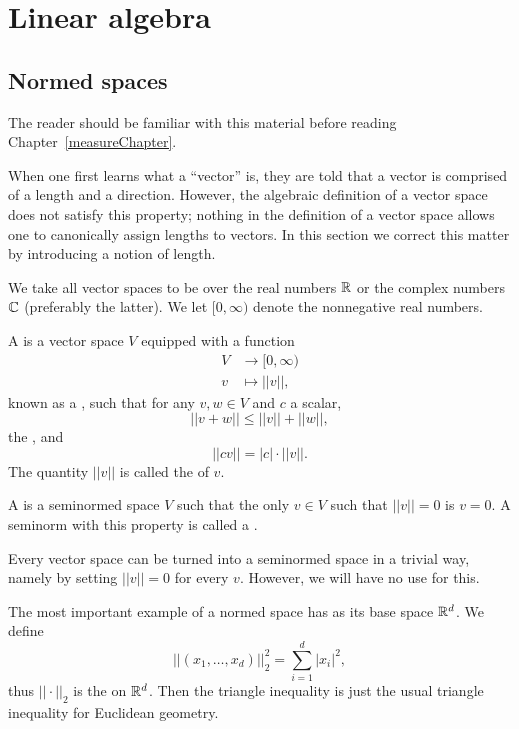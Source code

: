 \appendix
\chapter{Linear algebra}
\section{Normed spaces}
The reader should be familiar with this material before reading Chapter~\ref{measureChapter}.

When one first learns what a ``vector'' is, they are told that a vector is comprised of a length and a direction.
However, the algebraic definition of a vector space does not satisfy this property; nothing in the definition of a vector space allows one to canonically assign lengths to vectors.
In this section we correct this matter by introducing a notion of length.

We take all vector spaces to be over the real numbers $\mathbb{R}$ or the complex numbers $\mathbb{C}$ (preferably the latter).
We let $[0, \infty)$ denote the nonnegative real numbers.

\begin{definition}
A  is a vector space $V$ equipped with a function
\begin{align*}V &\to [0, \infty)\\
v &\mapsto ||v||,\end{align*}
known as a , such that for any $v, w \in V$ and $c$ a scalar,
\[||v + w|| \leq ||v|| + ||w||,\]
the , and
\[||cv|| = |c|\cdot||v||.\]
The quantity $||v||$ is called the  of $v$.

A  is a seminormed space $V$ such that the only $v \in V$ such that $||v|| = 0$ is $v = 0$.
A seminorm with this property is called a .
\end{definition}

\begin{example}
Every vector space can be turned into a seminormed space in a trivial way, namely by setting $||v|| = 0$ for every $v$.
However, we will have no use for this.
\end{example}

\begin{example}
The most important example of a normed space has as its base space $\mathbb{R}^{d}$.
We define
\[||(x_{1}, \dots, x_{d})||_{2}^{2} = \sum_{i=1}^{d} |x_{i}|^{2},\]
thus $||\cdot||_{2}$ is the  on $\mathbb{R}^{d}$.
Then the triangle inequality is just the usual triangle inequality for Euclidean geometry.
\end{example}

